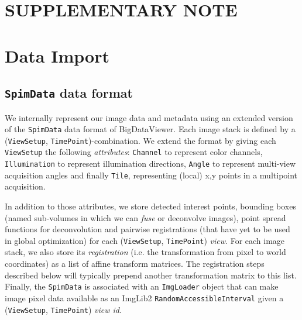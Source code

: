 \section*{SUPPLEMENTARY NOTE}

\hspace{20mm}

\section{Data Import}
\label{sec:sup-note1}

\subsection*{\texttt{SpimData} data format}

We internally represent our image data and metadata using an extended version of the \texttt{SpimData} data format of BigDataViewer\cite{pietzsch2015bigdataviewer}. Each image stack is defined by a (\texttt{ViewSetup}, \texttt{TimePoint})-combination. We extend the format by giving each \texttt{ViewSetup} the following \emph{attributes}: \texttt{Channel} to represent color channels, \texttt{Illumination} to represent illumination directions, \texttt{Angle} to represent multi-view acquisition angles and finally \texttt{Tile}, representing (local) x,y points in a multipoint acquisition.

In addition to those attributes, we store detected interest points, bounding boxes (named sub-volumes in which we can \emph{fuse} or deconvolve images), point spread functions for deconvolution and pairwise registrations (that have yet to be used in global optimization) for each (\texttt{ViewSetup}, \texttt{TimePoint}) \emph{view}. For each image stack, we also store its \emph{registration} (i.e. the transformation from pixel to world coordinates) as a list of affine transform matrices. The registration steps described below will typically prepend another transformation matrix to this list. Finally, the \texttt{SpimData} is associated with an \texttt{ImgLoader} object that can make image pixel data available as an ImgLib2 \texttt{RandomAccessibleInterval} given a  (\texttt{ViewSetup}, \texttt{TimePoint}) \emph{view id}.

